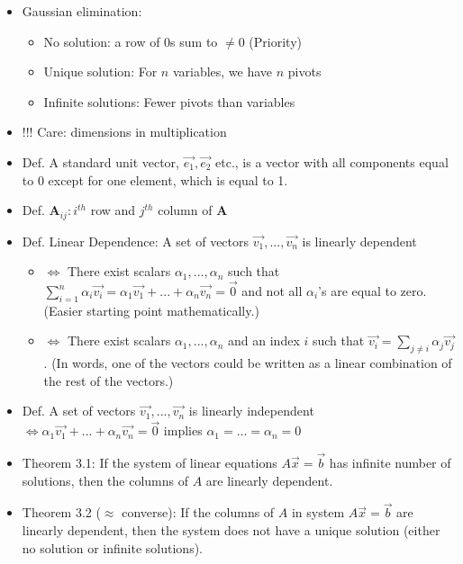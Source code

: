 \documentclass{article}
\begin{document}
\begin{itemize}
	\item Gaussian elimination:
	\begin{itemize}
		\item No solution: a row of 0s sum to $\neq 0$ (Priority)
		\item Unique solution: For $n$ variables, we have $n$ pivots
		\item Infinite solutions: Fewer pivots than variables
	\end{itemize}
\end{itemize}

\begin{itemize}
	\item {\color{red}!!! Care: dimensions in multiplication}
	\item Def. A standard unit vector, $\vec{e_1}, \vec{e_2}$ etc., is a vector with all components equal to 0 except for one element, which is equal to 1.
	\item Def. $\mathbf{A}_{ij}: i^{th}$ row and $j^{th}$ column of $\mathbf{A}$
	\item Def. Linear Dependence:
	A set of vectors ${\vec{v_1},...,\vec{v_n}}$ is linearly dependent
	\begin{itemize}
		\item $\iff$ There exist scalars $\alpha_1,...,\alpha_n$ such that $\sum\limits_{i=1}^n \alpha_i\vec{v_i} = \alpha_1\vec{v_1} + ... + \alpha_n\vec{v_n} = \vec{0}$ and not all $\alpha_i$'s are equal to zero. (Easier starting point mathematically.)
		\item $\iff$ There exist scalars $\alpha_1,...,\alpha_n$ and an index $i$ such that $\vec{v_i} = \sum\limits_{j\neq i} \alpha_j\vec{v_j}$.
		(In words, one of the vectors could be written as a linear combination of the rest of the vectors.)
	\end{itemize}
	\item Def. A set of vectors ${\vec{v_1},...,\vec{v_n}}$ is linearly independent $\iff \alpha_1\vec{v_1} + ... + \alpha_n\vec{v_n} = \vec{0}$ implies $\alpha_1 = ... = \alpha_n = 0$
	\item Theorem 3.1: If the system of linear equations $A\vec{x} = \vec{b}$ has infinite number of solutions, then the columns of $A$ are linearly dependent.
	\item Theorem 3.2 ($\approx$ converse): If the columns of $A$ in system $A\vec{x} = \vec{b}$ are linearly dependent, then the system does not have a unique solution (either no solution or infinite solutions).

\end{itemize}
\end{document}
